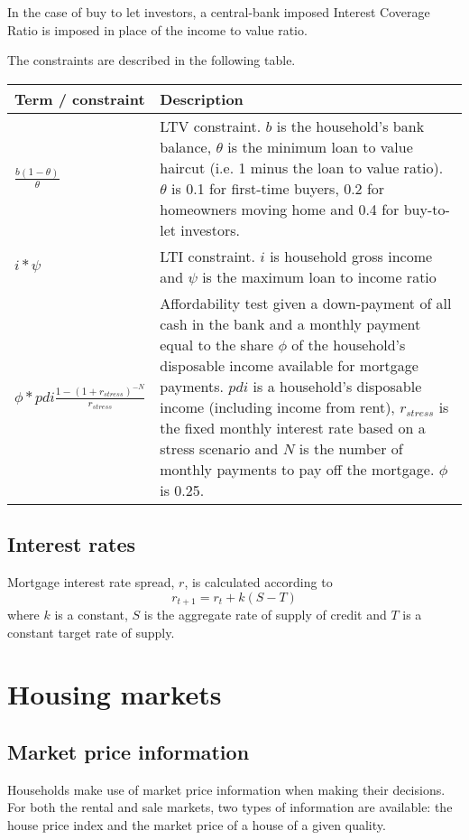 \documentclass{article}
\begin{document}
\bigskip

In the case of buy to let investors, a central-bank imposed Interest Coverage Ratio is imposed in place of the income to value ratio.

\bigskip The constraints are described in the following table.

\bigskip

\noindent \bigskip 
\begin{tabular}{p{1.5in}|p{4in}}
Term / constraint & Description \\ \hline\hline
$\frac{b(1-\theta )}{\theta }$ & LTV constraint. $b$ is the household's bank
balance, $\theta $ is the minimum loan to value haircut (i.e. 1 minus the
loan to value ratio). $\theta $ is 0.1 for first-time buyers, 0.2 for
homeowners moving home and 0.4 for buy-to-let investors. \\ 
$i\ast \psi $ & LTI constraint. $i$ is household gross income and $\psi $ is
the maximum loan to income ratio \\ 
$\phi \ast pdi\frac{1-(1+r_{stress})^{-N}}{r_{stress}}$ & Affordability test
given a down-payment of all cash in the bank and a monthly payment equal to
the share $\phi $ of the household's disposable income available for
mortgage payments. $pdi$ is a household's disposable income (including
income from rent), $r_{stress}$ is the fixed monthly interest rate based on
a stress scenario and $N$ is the number of monthly payments to pay off the
mortgage. $\phi $ is 0.25.%
\end{tabular}

\subsection{Interest rates}
Mortgage interest rate spread, $r$, is calculated according to
\[
r_{t+1} = r_{t} + k(S-T)
\]
where $k$ is a constant, $S$ is the aggregate rate of supply of credit and $T$ is a constant target rate of supply.

\section{Housing markets}

\subsection{Market price information}

Households make use of market price information when making their decisions. For both the rental and sale markets, two types of information are available: the house price index and the market price of a house of a given quality.
\end{document}
